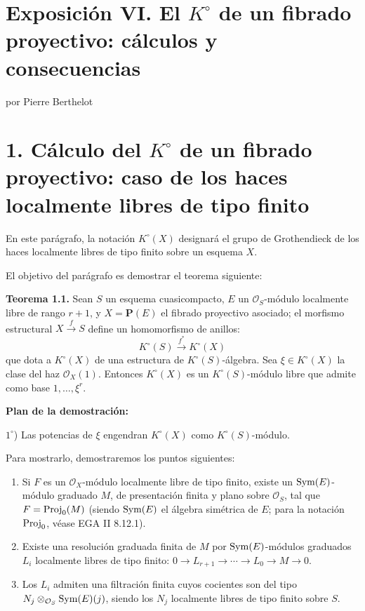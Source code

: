 \providecommand{\sisi}[2]{#2}

\section*{Exposición VI. El \(K^\circ\) de un fibrado proyectivo: cálculos y consecuencias}
\begin{center}
por Pierre Berthelot
\end{center}

\section*{1. Cálculo del \(K^\circ\) de un fibrado proyectivo: caso de los haces localmente libres de tipo finito}

En este parágrafo, la notación \(K^\circ(X)\) designará el grupo de Grothendieck de los haces localmente libres de tipo finito sobre un esquema \(X\).

El objetivo del parágrafo es demostrar el teorema siguiente:

\textbf{Teorema 1.1.} Sean \(S\) un esquema cuasicompacto, \(E\) un \(\mathcal O_S\)-módulo localmente libre de rango \(r+1\), y \(X=\mathbf P(E)\) el fibrado proyectivo asociado; el morfismo estructural \(X\xrightarrow{f}S\) define un homomorfismo de anillos:
\[
  K^\circ(S) \xrightarrow{f^*} K^\circ(X)
\]
que dota a \(K^\circ(X)\) de una estructura de \(K^\circ(S)\)-álgebra. Sea \(\xi\in K^\circ(X)\) la clase del haz \(\mathcal O_X(1)\). Entonces \(K^\circ(X)\) es un \(K^\circ(S)\)-módulo libre que admite como base \(1,\ldots,\xi^r\).

\textbf{Plan de la demostración:}

\(1^\circ\)) Las potencias de \(\xi\) engendran \(K^\circ(X)\) como \(K^\circ(S)\)-módulo.

Para mostrarlo, demostraremos los puntos siguientes:

\begin{enumerate}[label=\alph*)]
\item Si \(F\) es un \(\mathcal O_X\)-módulo localmente libre de tipo finito, existe un \(\operatorname{Sym}(E)\)-módulo graduado \(M\), de presentación finita y plano sobre \(\mathcal O_S\), tal que \(F=\operatorname{Proj}_0(M)\) (siendo \(\operatorname{Sym}(E)\) el álgebra simétrica de \(E\); para la notación \(\operatorname{Proj}_0\), véase EGA II 8.12.1).

\item Existe una resolución graduada finita de \(M\) por \(\operatorname{Sym}(E)\)-módulos graduados \(L_i\) localmente libres de tipo finito: \(0\longrightarrow L_{r+1}\longrightarrow\cdots\longrightarrow L_0\longrightarrow M\longrightarrow 0\).

\item Los \(L_i\) admiten una filtración finita cuyos cocientes son del tipo \(N_j\otimes_{\mathcal O_S}\operatorname{Sym}(E)(j)\), siendo los \(N_j\) localmente libres de tipo finito sobre \(S\).
\end{enumerate}

